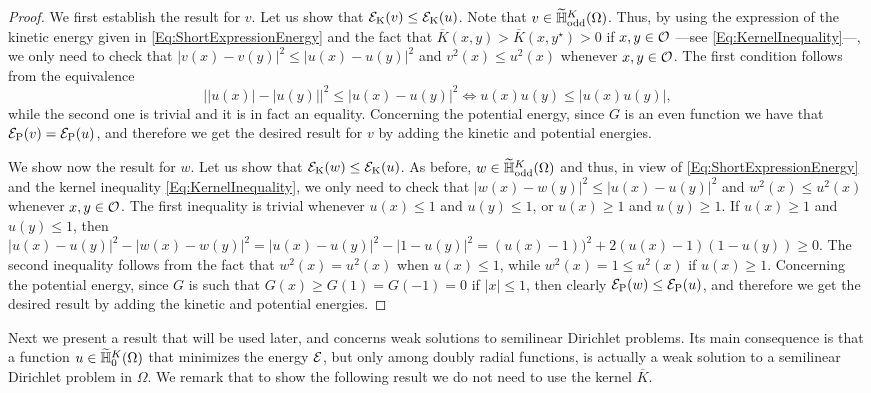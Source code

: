 \begin{proof}
We first establish the result for $v$. Let us show that  $\mathcal{E}_\mathrm{K}(v) \leq \mathcal{E}_\mathrm{K}(u)$. Note that $v\in \widetilde{\mathbb{H}}^K_{\mathrm{odd}}(\Omega)$. Thus, by using the expression of the kinetic energy given in \eqref{Eq:ShortExpressionEnergy} and the fact that $\overline{K}(x,y) > \overline{K}(x,y^\star)> 0$ if $x,y\in \mathcal{O}$ ---see \eqref{Eq:KernelInequality}---, we only need to check that $|v(x)-v(y)|^2\leq |u(x)-u(y)|^2$ and $v^2(x)\leq u^2(x)$ whenever $x,y\in\mathcal{O}$. The first condition follows from the equivalence
$$ \big||u(x)|-|u(y)|\big|^2\leq |u(x)-u(y)|^2 \Longleftrightarrow u(x)u(y) \leq |u(x)u(y)|,  
$$
while the second one is trivial and it is in fact an equality. Concerning the potential energy, since $G$ is an even function we have that $\mathcal{E}_\mathrm{P}(v) = \mathcal{E}_\mathrm{P}(u)$, and therefore we get the desired result for $v$ by adding the kinetic and potential energies.

We show now the result for $w$. Let us show that  $\mathcal{E}_\mathrm{K}(w) \leq \mathcal{E}_\mathrm{K}(u)$. As before, $w\in \widetilde{\mathbb{H}}^K_{\mathrm{odd}}(\Omega)$ and thus, in view of \eqref{Eq:ShortExpressionEnergy} and the kernel inequality \eqref{Eq:KernelInequality}, we only need to check that $|w(x)-w(y)|^2\leq |u(x)-u(y)|^2$ and $w^2(x) \leq u^2(x)$ whenever $x,y\in\mathcal{O}$. The first inequality is trivial whenever $u(x)\leq 1$ and $u(y)\leq 1$, or $u(x)\geq 1$ and $u(y)\geq 1$. If $u(x)\geq 1$ and $u(y)\leq 1$, then $ |u(x)-u(y)|^2-|w(x)-w(y)|^2 = |u(x)-u(y)|^2-|1-u(y)|^2 = (u(x)-1))^2+2(u(x)-1)(1-u(y)) \geq 0$. The second inequality follows from the fact that $w^2(x) = u^2(x)$ when $u(x)\leq 1$, while $w^2(x) = 1 \leq u^2(x)$ if $u(x)\geq 1$. Concerning the potential energy, since $G$ is such that $G(x)\geq G(1) = G(-1) = 0$ if $|x|\leq 1$, then clearly $\mathcal{E}_\mathrm{P}(w) \leq \mathcal{E}_\mathrm{P}(u)$, and therefore we get the desired result by adding the kinetic and potential energies.
\end{proof}



Next we present a result that will be used later, and concerns weak solutions to semilinear Dirichlet problems. Its main consequence is that a function $u\in \widetilde{\mathbb{H}}^K_{0}(\Omega)$ that minimizes the energy $\mathcal{E}$, but only among doubly radial functions, is actually a weak solution to a semilinear Dirichlet problem in $\Omega$. We remark that to show the following result we do not need to use the kernel $\overline{K}$.

